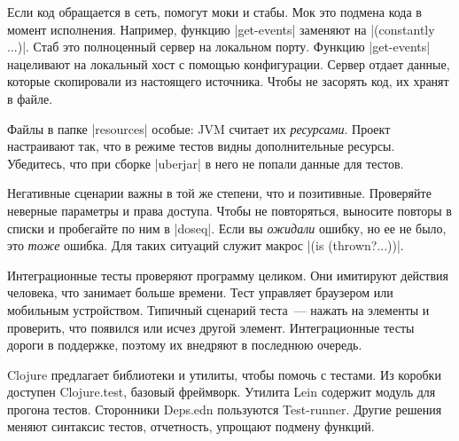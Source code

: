 Если код обращается в сеть, помогут моки и стабы. Мок это подмена кода в момент
исполнения. Например, функцию \spverb|get-events| заменяют на
\spverb|(constantly {...})|. Стаб это полноценный сервер на локальном
порту. Функцию \spverb|get-events| нацеливают на локальный хост с помощью
конфигурации. Сервер отдает данные, которые скопировали из настоящего
источника. Чтобы не засорять код, их хранят в файле.

Файлы в папке \spverb|resources| особые: JVM считает их \emph{ресурсами}. Проект
настраивают так, что в режиме тестов видны дополнительные ресурсы. Убедитесь,
что при сборке \spverb|uberjar| в него не попали данные для тестов.

Негативные сценарии важны в той же степени, что и позитивные. Проверяйте
неверные параметры и права доступа. Чтобы не повторяться, выносите повторы в
списки и пробегайте по ним в \spverb|doseq|. Если вы \emph{ожидали} ошибку, но
ее не было, это \emph{тоже} ошибка. Для таких ситуаций служит
макрос \spverb|(is (thrown?...))|.

Интеграционные тесты проверяют программу целиком. Они имитируют действия
человека, что занимает больше времени. Тест управляет браузером или мобильным
устройством. Типичный сценарий теста~--- нажать на элементы и проверить, что
появился или исчез другой элемент. Интеграционные тесты дороги в поддержке,
поэтому их внедряют в последнюю очередь.

Clojure предлагает библиотеки и утилиты, чтобы помочь с тестами. Из коробки
доступен Clojure.test, базовый фреймворк. Утилита Lein содержит модуль для
прогона тестов. Сторонники Deps.edn пользуются Test-runner. Другие решения
меняют синтаксис тестов, отчетность, упрощают подмену функций.

